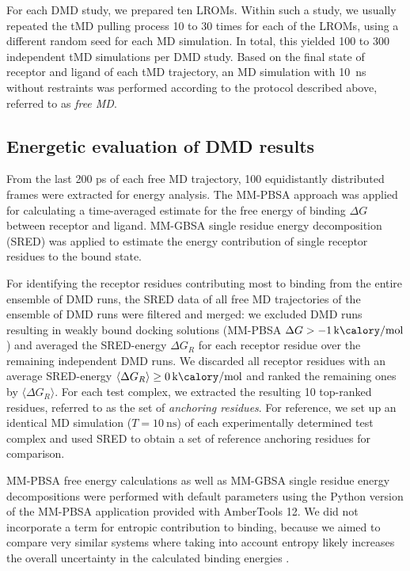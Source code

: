 For each DMD study, we prepared ten LROMs. Within such a study, we usually
repeated the tMD pulling process 10 to 30 times for each of the LROMs, using a
different random seed for each MD simulation. In total, this yielded 100 to 300
independent tMD simulations per DMD study. Based on the final state of receptor
and ligand of each tMD trajectory, an MD simulation with \SI{10}{\nano\second}
without restraints was performed according to the protocol described above,
referred to as \textit{free MD}.


\subsection{Energetic evaluation of DMD results}


From the last 200 ps of each free MD trajectory, 100 equidistantly distributed
frames were extracted for energy analysis. The MM-PBSA \cite{mmpbsa_py} approach
was applied for calculating a time-averaged estimate for the free energy of
binding $\Delta G$ between receptor and ligand. MM-GBSA \cite{mmpbsa_py} single
residue energy decomposition (SRED) was applied to estimate the energy
contribution of single receptor residues to the bound state.

For identifying the receptor residues contributing most to binding from the
entire ensemble of DMD runs, the SRED data of all free MD trajectories of the
ensemble of DMD runs were filtered and merged: we excluded DMD runs resulting in
weakly bound docking solutions (MM-PBSA $\Delta G >
\SI{-1}{\kilo\calory\per\mole} $) and averaged the SRED-energy $\Delta G_R$ for
each receptor residue over the remaining independent DMD runs. We discarded all
receptor residues with an average SRED-energy $\langle\Delta G_R\rangle \ge
\SI{0}{\kilo\calory\per\mole}$ and ranked the remaining ones by $\langle\Delta
G_R\rangle$. For each test complex, we extracted the resulting 10 top-ranked
residues, referred to as the set of \textit{anchoring residues}. For reference,
we set up an identical MD simulation ($T=\SI{10}{\nano\second}$) of each
experimentally determined test complex and used SRED to obtain a set of reference
anchoring residues for comparison.

MM-PBSA free energy calculations as well as MM-GBSA single residue energy
decompositions were performed with default parameters using the Python version
of the MM-PBSA application provided with AmberTools 12. We did not incorporate a
term for entropic contribution to binding, because we aimed to compare very
similar systems where taking into account entropy likely increases the overall
uncertainty in the calculated binding energies {\cite{mancera_mmpbsa_gags_2009,
homeyer_gohlke_2012}}.


